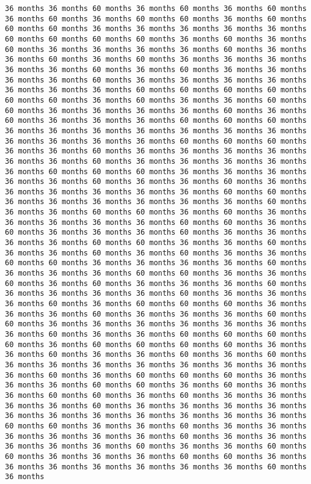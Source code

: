 \documentclass[11pt]{article}
\begin{document}
\begin{Verbatim}[commandchars=\\\{\}, frame=single, framerule=2mm, rulecolor=\color{outerrorbackground}]
36 months 36 months 60 months 36 months 60 months 36 months 60 months 36 months 60 months 36 months 60 months 60 months 36 months 60 months 60 months 60 months 36 months 36 months 36 months 36 months 36 months 60 months 60 months 60 months 60 months 36 months 60 months 36 months 60 months 36 months 36 months 36 months 36 months 60 months 36 months 36 months 60 months 36 months 60 months 36 months 36 months 36 months 36 months 36 months 60 months 36 months 60 months 36 months 36 months 36 months 36 months 60 months 36 months 36 months 36 months 36 months 36 months 36 months 36 months 60 months 60 months 60 months 60 months 60 months 60 months 36 months 60 months 36 months 36 months 60 months 60 months 36 months 36 months 36 months 36 months 60 months 36 months 60 months 36 months 36 months 36 months 60 months 60 months 60 months 36 months 36 months 36 months 36 months 36 months 36 months 36 months 36 months 36 months 36 months 36 months 60 months 60 months 60 months 36 months 36 months 60 months 36 months 36 months 36 months 36 months 36 months 36 months 60 months 36 months 36 months 36 months 36 months 36 months 60 months 60 months 60 months 36 months 36 months 36 months 36 months 36 months 60 months 36 months 36 months 60 months 36 months 36 months 36 months 36 months 36 months 36 months 60 months 60 months 36 months 36 months 36 months 36 months 36 months 36 months 60 months 36 months 36 months 60 months 60 months 36 months 60 months 36 months 36 months 36 months 36 months 36 months 60 months 60 months 36 months 60 months 36 months 36 months 36 months 60 months 36 months 36 months 36 months 36 months 60 months 60 months 36 months 36 months 60 months 36 months 36 months 60 months 36 months 60 months 36 months 36 months 60 months 60 months 36 months 36 months 36 months 36 months 60 months 36 months 36 months 36 months 60 months 60 months 36 months 36 months 60 months 36 months 60 months 36 months 36 months 36 months 60 months 36 months 36 months 36 months 36 months 60 months 36 months 36 months 36 months 60 months 36 months 60 months 60 months 60 months 36 months 36 months 36 months 60 months 36 months 36 months 36 months 60 months 60 months 36 months 36 months 36 months 36 months 36 months 36 months 36 months 60 months 36 months 36 months 60 months 60 months 60 months 60 months 36 months 60 months 60 months 60 months 60 months 36 months 36 months 60 months 36 months 36 months 60 months 36 months 60 months 36 months 36 months 36 months 36 months 36 months 36 months 36 months 36 months 60 months 36 months 60 months 60 months 60 months 36 months 36 months 36 months 60 months 60 months 36 months 60 months 36 months 36 months 60 months 60 months 36 months 60 months 36 months 36 months 36 months 36 months 60 months 36 months 36 months 36 months 36 months 36 months 36 months 36 months 36 months 36 months 36 months 36 months 60 months 60 months 36 months 36 months 60 months 36 months 36 months 36 months 36 months 36 months 36 months 60 months 36 months 36 months 36 months 36 months 36 months 60 months 36 months 36 months 60 months 60 months 36 months 36 months 36 months 60 months 60 months 36 months 36 months 36 months 36 months 36 months 36 months 36 months 60 months 36 months 
\end{Verbatim}
\end{document}
